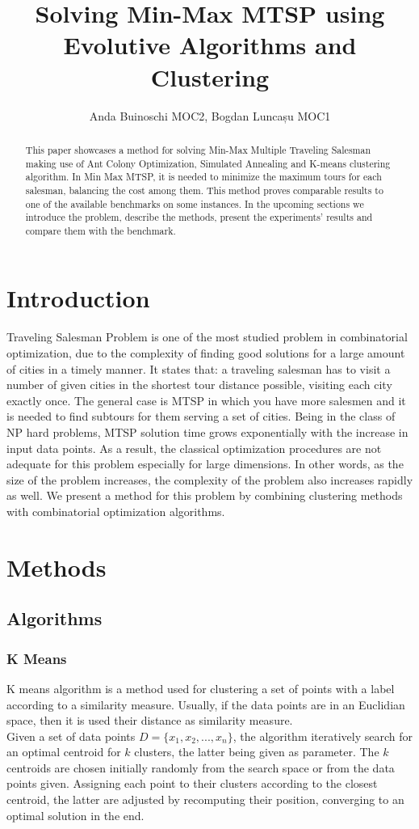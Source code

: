 \documentclass{article}
\title{Solving Min-Max MTSP using Evolutive Algorithms and Clustering}
\author{Anda Buinoschi MOC2, Bogdan Luncașu MOC1 }
\date{}
\begin{document}
\maketitle

\begin{abstract}
This paper showcases a method for solving Min-Max Multiple Traveling Salesman making use of Ant Colony Optimization, Simulated Annealing and K-means clustering algorithm. In Min Max MTSP, it is needed to minimize the maximum tours for each salesman, balancing the cost among them. This method proves comparable results to one of the available benchmarks on some instances. In the upcoming sections we introduce the problem, describe the methods, present the experiments' results and compare them with the benchmark.
\end{abstract}

\section{Introduction}
Traveling Salesman Problem is one of the most studied problem in combinatorial optimization, due to the complexity of finding good solutions for a large amount of cities in a timely manner. It states that: a traveling salesman has to visit a number of given cities in the shortest tour distance possible, visiting each city exactly once. The general case is MTSP in which you have more salesmen and it is needed to find subtours for them serving a set of cities. Being in the class of NP hard problems, MTSP solution time grows exponentially with the increase in input data points. As a result, the classical optimization procedures are not adequate for this problem especially for large dimensions. In other words, as the size of the problem increases, the complexity of the problem also increases rapidly as well. We present a method for this problem by combining clustering methods with combinatorial optimization algorithms.

\section{Methods}
\subsection{Algorithms}
\subsubsection{K Means}
K means algorithm is a method used for clustering a set of points with a label according to a similarity measure. Usually, if the data points are in an Euclidian space, then it is used their distance as similarity measure.\\
Given a set of data points $D=\{x_1, x_2,...,x_n\}$, the algorithm iteratively search for an optimal centroid for $k$ clusters, the latter being given as parameter. The $k$ centroids are chosen initially randomly from the search space or from the data points given. Assigning each point to their clusters according to the closest centroid, the latter are adjusted by recomputing their position, converging to an optimal solution in the end.
\end{document}
